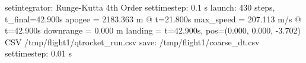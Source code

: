 \begin{console}
\ok setintegrator: Runge-Kutta 4th Order
\ok settimestep: 0.1 s
\ok launch: 430 steps, t_final=42.900s
  apogee    = 2183.363 m @ t=21.800s
  max_speed = 207.113 m/s @ t=42.900s
  downrange = 0.000 m
  landing   = t=42.900s, pos=(0.000, 0.000, -3.702)
CSV /tmp/flight1/qtrocket_run.csv
\ok save: /tmp/flight1/coarse_dt.csv
\ok settimestep: 0.01 s
\end{console}
